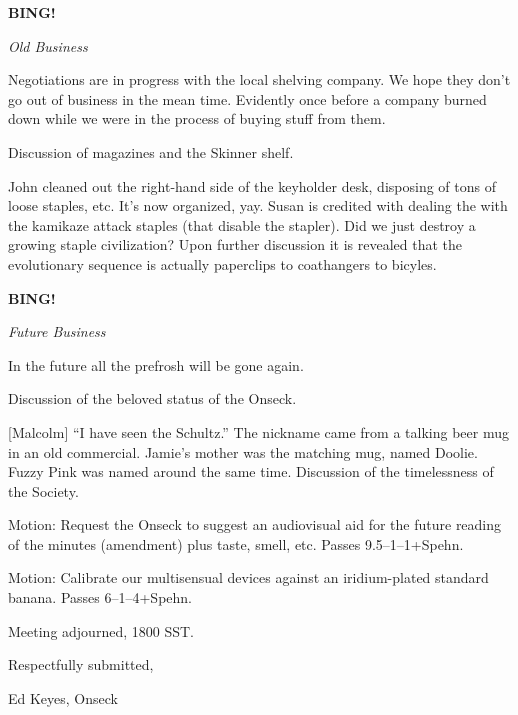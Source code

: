\documentclass[12pt]{article}
\newcommand{\bing}{{\bf BING!} }
\newcommand{\goto}[1]{\bing \vskip 12pt \centerline{{\em{#1}}}}
\begin{document}
\goto{Old Business}

Negotiations are in progress with the local shelving company.  We
hope they don't go out of business in the mean time.  Evidently once
before a company burned down while we were in the process of buying
stuff from them.

Discussion of magazines and the Skinner shelf.

John cleaned out the right-hand side of the keyholder desk, disposing
of tons of loose staples, etc.  It's now organized, yay.  Susan is
credited with dealing the with the kamikaze attack staples (that
disable the stapler).  Did we just destroy a growing staple
civilization?  Upon further discussion it is revealed that the
evolutionary sequence is actually paperclips to coathangers to
bicyles.

\goto{Future Business}

In the future all the prefrosh will be gone again.

Discussion of the beloved status of the Onseck.

[Malcolm] ``I have seen the Schultz.''  The nickname came from a talking
beer mug in an old commercial.  Jamie's mother was the matching mug,
named Doolie.  Fuzzy Pink was named around the same time.  Discussion
of the timelessness of the Society.

Motion: Request the Onseck to suggest an audiovisual aid for the
future reading of the minutes (amendment) plus taste, smell, etc.
Passes 9.5--1--1+Spehn.

Motion: Calibrate our multisensual devices against an iridium-plated
standard banana.  Passes 6--1--4+Spehn.

\vspace{12pt}

\noindent
Meeting adjourned, 1800 SST.

\vspace{18pt}

\centerline{Respectfully submitted,}
\centerline{Ed Keyes, Onseck}
\end{document}
